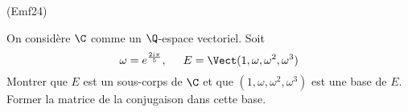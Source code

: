 \begin{tiny}(Emf24)\end{tiny} On considère $\C$ comme un $\Q$-espace vectoriel. Soit
\begin{displaymath}
  \omega = e^{\frac{2i\pi}{5}},\hspace{0.5cm} E=\Vect(1,\omega,\omega^2,\omega^3)
\end{displaymath}
Montrer que $E$ est un sous-corps de $\C$ et que $(1,\omega,\omega^2,\omega^3)$ est une base de $E$. Former la matrice de la conjugaison dans cette base.